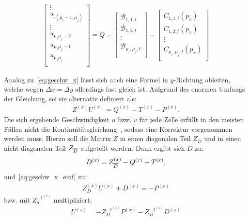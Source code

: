 {\begin{minipage}{\textheight}
\begin{align}
\begin{bmatrix}
        \vdots \\
        u_{\square(\mu_i - 1, \mu_j)} \\
        \vdots \\
        u_{\mu_i \mu_j - 2} \\
        u_{\mu_i \mu_j - 1} \\
        u_{\mu_i \mu_j} \\
    \end{bmatrix}
    =
    Q- \begin{bmatrix}
        \mathcal{B}_{1,1,t} \\
        \mathcal{B}_{1,2,t} \\
        \vdots \\
        \mathcal{B}_{\mu_i, \mu_j, t} \\
    \end{bmatrix}
    -
    \begin{bmatrix}
        C_{1,1,t}(p_x) \\
        C_{1,2,t}(p_x) \\
        \vdots \\
        C_{\mu_i,\mu_j,t}(p_x) \\
    \end{bmatrix}
\end{align}
\end{minipage}
}
Analog zu~\eqref{eq:geschw_x} lässt sich auch eine Formel in $y$-Richtung ableiten, welche wegen $\Delta x = \Delta y$ allerdings fast gleich ist. Aufgrund des enormen Umfangs der Gleichung, sei sie alternativ definiert als:
\begin{align}
\label{eq:geschw_x_einf}
    Z^{(x)} U^{(x)} = Q^{(x)} - T^{(x)} - P^{(x)}.
\end{align}
Die sich ergebende Geschwindigkeit $u$ bzw. $v$ für jede Zelle erfüllt in den meisten Fällen nicht die Kontinuitätsgleichung~\cite[nach][S. 213]{ferziger_computational_2020}, sodass eine Korrektur vorgenommen werden muss. 
Hierzu soll die Matrix $Z$ in einen diagonalen Teil $Z_D$ und in einen nicht-diagonalen Teil $Z_{\overline{D}}$ aufgeteilt werden. 
Dann ergibt sich $D$ zu:
\begin{align*}
    D^{(x)} = Z_{\overline{D}}^{(x)} - Q^{(x)} + T^{(x)}.
\end{align*}
und~\eqref{eq:geschw_x_einf} zu:
\begin{align*}
    Z_D^{(x)} U^{(x)} + D^{(x)} = -P^{(x)}
\end{align*}
bzw. mit $Z_d^{-1^{(x)}}$ multipliziert:
\begin{align}
\label{eq:geschw_korrektur}
    U^{(x)} = - Z_D^{-1^{(x)}} P^{(x)} - Z_D^{-1^{(x)}} D^{(x)}
\end{align}
